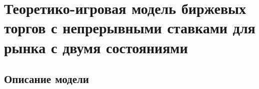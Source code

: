 \chapter{Теоретико-игровая модель биржевых торгов с непрерывными ставками для
  рынка с двумя состояниями} \label{chapt2}

\section{Описание модели}


